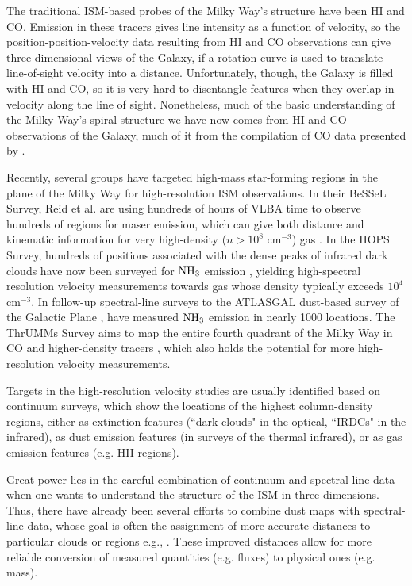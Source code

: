 \documentclass[]{article}
\begin{document}
The traditional ISM-based probes of the Milky Way's structure have been
HI and CO. Emission in these tracers gives line intensity as a function
of velocity, so the position-position-velocity data resulting from HI
and CO observations can give three dimensional views of the Galaxy, if a
rotation curve is used to translate line-of-sight velocity into a
distance. Unfortunately, though, the Galaxy is filled with HI and CO, so
it is very hard to disentangle features when they overlap in velocity
along the line of sight. Nonetheless, much of the basic understanding of
the Milky Way's spiral structure we have now comes from HI and CO
observations of the Galaxy, much of it from the compilation of CO data
presented by \citet{Dame2001}.

Recently, several groups have targeted high-mass star-forming regions in
the plane of the Milky Way for high-resolution ISM observations. In
their BeSSeL Survey, Reid et al. are using hundreds of hours of VLBA
time to observe hundreds of regions for maser emission, which can give
both distance and kinematic information for very high-density ($n>10^8$
cm$^{-3}$) gas \citep{Reid2009,Brunthaler2011}. In the HOPS Survey,
hundreds of positions associated with the dense peaks of infrared dark
clouds have now been surveyed for ${\rm NH}_3$ emission
\citep{Purcell2012b}, yielding high-spectral resolution velocity
measurements towards gas whose density typically exceeds $10^4$
cm$^{-3}$. In follow-up spectral-line surveys to the ATLASGAL dust-based
survey of the Galactic Plane \citep{Beuther2012a}, \citet{Wienen2012}
have measured ${\rm NH}_3$ emission in nearly 1000 locations. The
ThrUMMs Survey aims to map the entire fourth quadrant of the Milky Way
in CO and higher-density tracers \citep{BarnesPeter2010}, which also
holds the potential for more high-resolution velocity measurements.

Targets in the high-resolution velocity studies are usually identified
based on continuum surveys, which show the locations of the highest
column-density regions, either as extinction features (``dark clouds" in
the optical, ``IRDCs" in the infrared), as dust emission features (in
surveys of the thermal infrared), or as gas emission features (e.g. HII
regions).

Great power lies in the careful combination of continuum and
spectral-line data when one wants to understand the structure of the ISM
in three-dimensions. Thus, there have already been several efforts to
combine dust maps with spectral-line data, whose goal is often the
assignment of more accurate distances to particular clouds or regions
e.g., \citep{Foster2012}. These improved distances allow for more
reliable conversion of measured quantities (e.g. fluxes) to physical
ones (e.g. mass).
\end{document}
